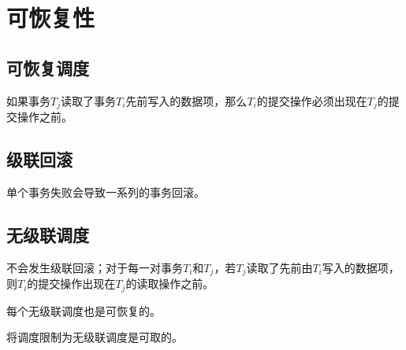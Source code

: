 \section{可恢复性}

\subsection{可恢复调度}

如果事务$T_j$读取了事务$T_i$先前写入的数据项，那么$T_i$的提交操作必须出现在$T_j$的提交操作之前。

\subsection{级联回滚}

单个事务失败会导致一系列的事务回滚。

\subsection{无级联调度}

不会发生级联回滚；对于每一对事务$T_i$和$T_j$，若$T_j$读取了先前由$T_i$写入的数据项，则$T_i$的提交操作出现在$T_j$的读取操作之前。

每个无级联调度也是可恢复的。

将调度限制为无级联调度是可取的。